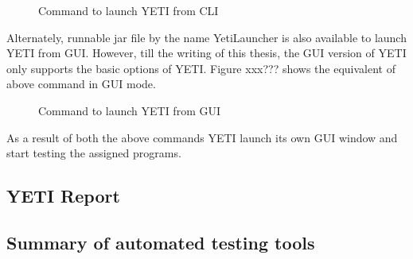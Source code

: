 \begin{enumerate}
\begin{figure}[h]
	\centering
	\caption{Command to launch YETI from CLI}
\end{figure}

Alternately, runnable jar file by the name YetiLauncher is also available to launch YETI from GUI. However, till the writing of this thesis, the GUI version of YETI only supports the basic options of YETI. Figure xxx??? shows the equivalent of above command in GUI mode.

\begin{figure}[h]
	\centering
	\caption{Command to launch YETI from GUI}
\end{figure}


As a result of both the above commands YETI launch its own GUI window and start testing the assigned programs. 




\subsection{YETI Report}



\subsection{Summary of automated testing tools}


\end{enumerate}
